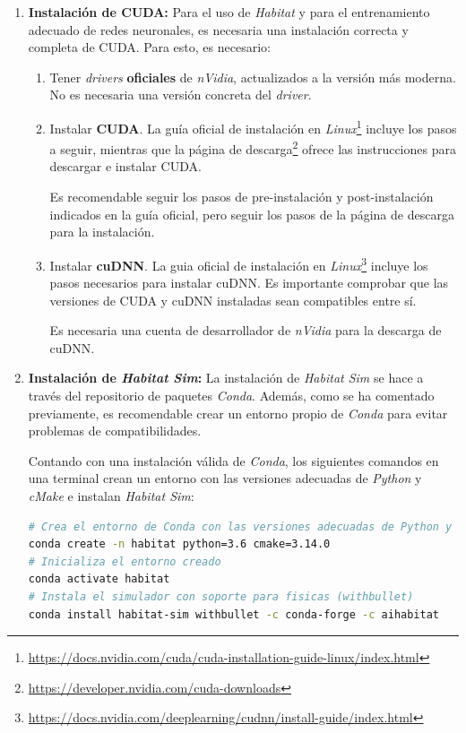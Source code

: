 \begin{enumerate}
	\item \textbf{Instalación de CUDA:} Para el uso de \textit{Habitat} y para el entrenamiento adecuado de redes neuronales, es necesaria una instalación correcta y completa de CUDA. Para esto, es necesario:
	\begin{enumerate}
		\item Tener \textit{drivers} \textbf{oficiales} de \textit{nVidia}, actualizados a la versión más moderna. No es necesaria una versión concreta del \textit{driver}.
		\item Instalar \textbf{CUDA}. La guía oficial de instalación en \textit{Linux}\footnote{\url{https://docs.nvidia.com/cuda/cuda-installation-guide-linux/index.html}} incluye los pasos a seguir, mientras que la página de descarga\footnote{\url{https://developer.nvidia.com/cuda-downloads}} ofrece las instrucciones para descargar e instalar CUDA.
		
		Es recomendable seguir los pasos de pre-instalación y post-instalación indicados en la guía oficial, pero seguir los pasos de la página de descarga para la instalación.
		
		\item Instalar \textbf{cuDNN}. La guia oficial de instalación en \textit{Linux}\footnote{\url{https://docs.nvidia.com/deeplearning/cudnn/install-guide/index.html}} incluye los pasos necesarios para instalar cuDNN. Es importante comprobar que las versiones de CUDA y cuDNN instaladas sean compatibles entre sí.
		
		Es necesaria una cuenta de desarrollador de \textit{nVidia} para la descarga de cuDNN.
	\end{enumerate}
	\item \textbf{Instalación de \textit{Habitat Sim}:} La instalación de \textit{Habitat Sim} se hace a través del repositorio de paquetes \textit{Conda}. Además, como se ha comentado previamente, es recomendable crear un entorno propio de \textit{Conda} para evitar problemas de compatibilidades. 
	
	Contando con una instalación válida de \textit{Conda}, los siguientes comandos en una terminal crean un entorno con las versiones adecuadas de \textit{Python} y \textit{cMake} e instalan \textit{Habitat Sim}:

\begin{lstlisting}[language=bash]
# Crea el entorno de Conda con las versiones adecuadas de Python y cMake
conda create -n habitat python=3.6 cmake=3.14.0
# Inicializa el entorno creado
conda activate habitat
# Instala el simulador con soporte para fisicas (withbullet)
conda install habitat-sim withbullet -c conda-forge -c aihabitat
\end{lstlisting}	
	

\end{enumerate}
